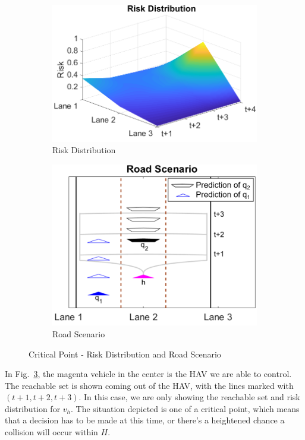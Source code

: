 \documentclass[letterpaper, 10 pt, conference]{ieeeconf}  %
\begin{document}
\begin{figure}[h]
\centering
\begin{subfigure}{.54\linewidth}
  \centering
  \includegraphics[width=\linewidth]{fig/critpt_rd.png}
  \caption{Risk Distribution}
  \label{fig:critptrd}
\end{subfigure}%
\begin{subfigure}{.46\linewidth}
  \centering
  \includegraphics[width=\linewidth]{fig/critpt_rs.png}
  \caption{Road Scenario}
  \label{fig:critptrs}
\end{subfigure}
\caption{Critical Point - Risk Distribution and Road Scenario} \label{fig:critpt}
\end{figure}

In Fig.~\ref{fig:critpt}, the magenta vehicle in the center is the HAV we are able to control. The reachable set is shown coming out of the HAV, with the lines marked with $(t+1,t+2,t+3)$. In this case, we are only showing the reachable set and risk distribution for $v_h$. The situation depicted is one of a critical point, which means that a decision has to be made at this time, or there's a heightened chance a collision will occur within $H$. 
\end{document}
